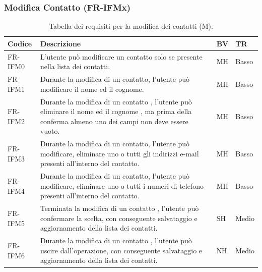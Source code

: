 \documentclass[a4paper,12pt]{article}
\begin{document}
    \subsubsection{Modifica Contatto (FR-IFMx)}
    \begin{table}[H]
        \centering
        \begin{tabular}{|l|p{8cm}|l|l|}
            \hline
            \textbf{Codice} & \textbf{Descrizione} & \textbf{BV} & \textbf{TR} \\
            \hline
            FR-IFM0 & L'utente può modificare un contatto solo se presente nella lista dei contatti. & MH & Basso \\
            \hline
            FR-IFM1 & Durante la modifica di un contatto, l'utente può modificare il nome ed il cognome.  & MH & Basso
            \\
            \hline
            FR-IFM2 & Durante la modifica di un contatto , l'utente può eliminare il nome ed il cognome , ma prima della conferma almeno uno dei campi non deve essere vuoto. & MH & Basso
            \\
            \hline
            FR-IFM3 & Durante la modifica di un contatto, l'utente può modificare, eliminare uno o tutti gli indirizzi e-mail presenti all'interno del contatto.  & MH & Basso
            \\
            \hline
            FR-IFM4 & Durante la modifica di un contatto, l'utente può modificare, eliminare uno o tutti i numeri di telefono presenti all'interno del contatto. & MH & Basso
            \\
            \hline
            FR-IFM5 & Terminata la modifica di un contatto , l'utente può confermare la scelta, con conseguente salvataggio e aggiornamento della lista dei contatti. & SH & Medio
            \\
            \hline
            FR-IFM6 & Durante la modifica di un contatto , l'utente può uscire dall'operazione, con conseguente salvataggio e aggiornamento della lista dei contatti. & NH & Medio
            \\
            \hline
        \end{tabular}
        \caption{Tabella dei requisiti per la modifica dei contatti (M).}
    \end{table}
    \nopagebreak
\end{document}
